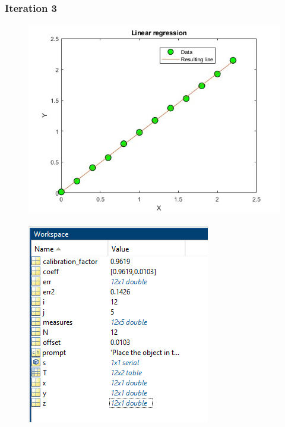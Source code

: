 \clearpage

\subsubsection{Iteration 3}

\begin{figure}[ht]
\centering
\begin{minipage}{.6\textwidth} %
  \centering
  \includegraphics[width=.9\linewidth]{medias/test/calibration/figure_3.jpg}
  \label{fig:test7}
\end{minipage}%
\begin{minipage}{.4\textwidth} %
  \centering
  \includegraphics[width=.9\linewidth]{medias/test/calibration/workspace_3.png}
  \label{fig:test8}
\end{minipage}
\end{figure}

